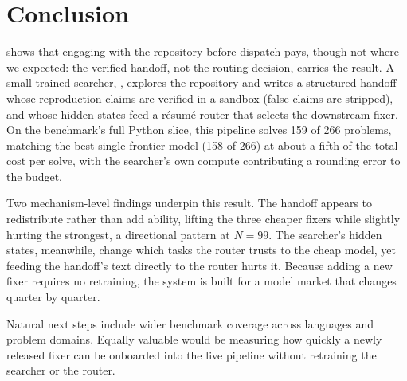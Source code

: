 
\section{Conclusion}
\label{sec:conclusion}

\sysname shows that engaging with the repository before dispatch pays, though not where we expected: the verified handoff, not the routing decision, carries the result.
A small trained searcher, \modelname, explores the repository and writes a structured handoff whose reproduction claims are verified in a sandbox (false claims are stripped), and whose hidden states feed a r\'{e}sum\'{e} router that selects the downstream fixer.
On the benchmark's full Python slice, this pipeline solves 159 of 266 problems, matching the best single frontier model (158 of 266) at about a fifth of the total cost per solve, with the searcher's own compute contributing a rounding error to the budget.

Two mechanism-level findings underpin this result.
The handoff appears to redistribute rather than add ability, lifting the three cheaper fixers while slightly hurting the strongest, a directional pattern at $N{=}99$.
The searcher's hidden states, meanwhile, change which tasks the router trusts to the cheap model, yet feeding the handoff's text directly to the router hurts it.
Because adding a new fixer requires no retraining, the system is built for a model market that changes quarter by quarter.

Natural next steps include wider benchmark coverage across languages and problem domains.
Equally valuable would be measuring how quickly a newly released fixer can be onboarded into the live pipeline without retraining the searcher or the router.
